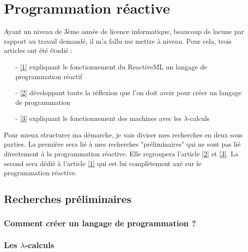 \documentclass[10pt,a4paper]{article}
\begin{document}
		
	
	\section{Programmation réactive}
	 
	 	Ayant un niveau de 3ème année de licence informatique, beaucoup de lacune par rapport au travail demandé, il m'a fallu me mettre à niveau. Pour cela, trois articles ont été étudié : 
	 	\begin{enumerate}
	 		\item[-] \hyperref[ReactiveML]{[1]} expliquant le fonctionnement du ReactiveML un langage de programmation réactif
	 		\item[-] \hyperref[ZINC]{[2]} développant toute la réflexion que l'on doit avoir pour créer un langage de programmation
		 	\item[-] \hyperref[Calculi]{[3]} expliquant le fonctionnement des machines avec les $\lambda$-calculs
		 \end{enumerate}
 		 Pour mieux structurer ma démarche, je vais diviser mes recherches en deux sous parties. La première sera lié à mes recherches "préliminaires" qui ne sont pas lié directement à la programmation réactive. Elle regroupera l'article \hyperref[ZINC]{[2]} et \hyperref[Calculi]{[3]}. La second sera dédié à l'article \hyperref[ReactiveML]{[1]} qui est lui complètement axé sur le programmation réactive. 
	 
		\subsection{Recherches préliminaires}
			
			\subsubsection{Comment créer un langage de programmation ?}
	
			\subsubsection{Les  $\lambda$-calculs}
			
\end{document}
